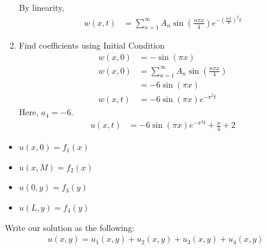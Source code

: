 \documentclass{article}
\begin{document}
\begin{enumerate}
  By linearity,
  \begin{align}
    w(x, t) & = \sum^\infty_{n = 1} A_n \sin\left(\frac{n \pi x}{4} \right)e^{-\left( \frac{n \pi}{4} \right)^2 t}
  \end{align}

  \item Find coefficients using Initial Condition
  \begin{align}
    w(x, 0) & = -\sin(\pi x)\\
    w(x, 0) & = \sum^\infty_{n = 1} A_n \sin\left(\frac{n \pi x}{4}\right)\\
    & = -6 \sin(\pi x)\\
    w(x, t) & = -6 \sin(\pi x) e^{-\pi^2 t}
  \end{align}
  Here, $a_4 = -6$.
  \begin{align}
    u(x, t) & = -6 \sin(\pi x)e^{-\pi^2 t} + \frac{x}{4} + 2
  \end{align}
\end{enumerate}
\begin{itemize}
  \item $u(x, 0) = f_1(x)$
  \item $u(x, M) = f_2(x)$
  \item $u(0, y) = f_3(y)$
  \item $u(L, y) = f_4(y)$
\end{itemize}

Write our solution as the following:
\begin{align}
  u(x, y) = u_1(x, y) + u_2(x, y) + u_3(x, y) + u_4(x, y)
\end{align}
\end{document}
